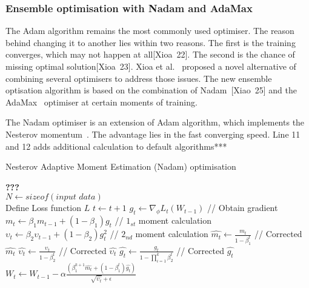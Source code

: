 \subsubsection{Ensemble optimisation with Nadam and AdaMax}
The Adam algorithm remains the most commonly used optimiser.
The reason behind changing it to another lies within two reasons.
The first is the training converges, which may not happen at all[Xioa~22].
The second is the chance of missing optimal solution[Xioa~23].
Xioa et al.~\cite{xiao_accurate_2019} proposed a novel alternative of combining several optimisers to address those issues.
The new ensemble optisation algorithm is based on the combination of Nadam~[Xiao~25] and the AdaMax~\cite{kingma_adam_2017} optimiser at certain moments of training.

%
%
The Nadam optimiser is an extension of Adam algorithm, which implements the Nesterov momentum~\cite{dozat_nadam_2016}.
The advantage lies in the fast converging speed.
Line 11 and 12 adds additional calculation to default algorithms*** \\
\begin{algorithm}
  \caption{Nesterov Adaptive Moment Estimation (Nadam) optimisation}
  \begin{algorithmic}[1]
    \STATE \textbf{???} \\ $N\gets sizeof(\textit{input data})$\\
    \STATE Define Loss function $L$
    \STATE $t \gets t+1$
    \STATE $g_t \gets \nabla_\phi L_t (W_{t-1})$ // Obtain gradient
    \STATE $m_t \gets \beta_1 m_{t-1}+(1-\beta_1) g_t $ // $1_{st}$ moment calculation
    \STATE $\upsilon_t \gets \beta_2 \upsilon_{t-1}+ \left(1-\beta_2 \right)g^2_t $ // $2_{nd}$ moment calculation \label{alg:Adam-Line-2Moment}
    \STATE $\hat{m_t} \gets \frac{m_t}{1-\beta^t_1}$ // Corrected $\hat{m_t}$
    \STATE $\hat{\upsilon_t} \gets \frac{\upsilon_t}{1-\beta^t_2} $ // Corrected $\hat{\upsilon_t}$
    \STATE $\hat{g_t} \gets \frac{g_t}{1-\prod\nolimits_{i = 1}^{k}\beta^t_2} $ // Corrected $\hat{g_t}$
    \STATE $W_t \gets W_{t-1}-\alpha
                        \frac{\left(\beta^{k+1}_1\hat{m_t}+\left(1-\beta^t_1\right)\hat{g_t}\right)}
                             {\sqrt{\hat{\upsilon_t}}+\epsilon}$
    \ENDWHILE
  \end{algorithmic}
  \label{alg:nadam}
\end{algorithm}

